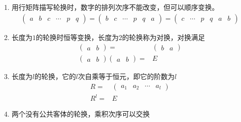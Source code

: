 \begin{note}
\begin{enumerate}
\item 用行矩阵描写轮换时，数字的排列次序不能改变，但可以顺序变换。
\begin{equation}\begin{aligned}
\begin{pmatrix}
a&b&c&\cdots&p&q
\end{pmatrix}=
\begin{pmatrix}
b&c&\cdots&p&q&a
\end{pmatrix}=
\begin{pmatrix}
c&\cdots&p&q&a&b
\end{pmatrix}
\end{aligned}\end{equation}
\item 长度为$1$的轮换时恒等变换，长度为$2$的轮换称为{\color{seco}对换}，对换满足
\begin{equation}\begin{aligned}
\begin{pmatrix}
a&b
\end{pmatrix}={}&
\begin{pmatrix}
b&a
\end{pmatrix}\\
\begin{pmatrix}
a&b
\end{pmatrix}
\begin{pmatrix}
a&b
\end{pmatrix}={}&
E
\end{aligned}\end{equation}
\item 
长度为$l$的轮换，它的$l$次自乘等于恒元，即它的阶数为$l$
\begin{equation}
\begin{aligned}
	R={}&
\begin{pmatrix}
a_1&a_2&\cdots&a_l
\end{pmatrix}\\
R^l={}&
E
\end{aligned}
\end{equation}
\item 
两个没有公共客体的轮换，乘积次序可以交换
\begin{equation}
\begin{aligned}

\end{aligned}
\end{equation}
\end{enumerate}
\end{note}
